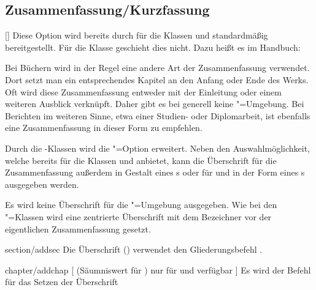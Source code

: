 \subsection{Zusammenfassung/Kurzfassung}
\begin{Declaration}{[\PSet]}%
\printdeclarationlist%
%
%
%
Diese Option wird bereits durch \KOMAScript{} für die Klassen  
und  standardmäßig bereitgestellt. Für die Klasse 
 geschieht dies nicht. Dazu heißt es im Handbuch:
%
\begin{quoting}
Bei Büchern wird in der Regel eine andere Art der Zusammenfassung verwendet. 
Dort setzt man ein entsprechendes Kapitel an den Anfang oder Ende des Werks. 
Oft wird diese Zusammenfassung entweder mit der Einleitung oder einem weiteren 
Ausblick verknüpft. Daher gibt es bei  generell keine 
"=Umgebung. Bei Berichten im weiteren Sinne, etwa einer 
Studien- oder Diplomarbeit, ist ebenfalls eine Zusammenfassung in dieser Form 
zu empfehlen.
\end{quoting}
%
Durch die \TUDScript-Klassen wird die "=Option erweitert. 
Neben den Auswahlmöglichkeit, welche bereits \KOMAScript{} für die Klassen 
 und  anbietet, kann die Überschrift für 
die Zusammenfassung außerdem in Gestalt eines \sectionautorefname{}s oder für 
 und  in der Form eines 
\chapterautorefname{}s ausgegeben werden.
%
\begin{values}
  Es wird keine Überschrift für die "=Umgebung ausgegeben.
  Wie bei den \KOMAScript"=Klassen wird eine zentrierte Überschrift mit dem 
  Bezeichner  vor der eigentlichen Zusammenfassung gesetzt.
\item[section/addsec]
  Die Überschrift () verwendet den Gliederungsbefehl 
  .
\item[chapter/addchap][%
    (Säumniswert für \Class{tudscrbook})
    nur für \Class{tudscrreprt} und \Class{tudscrbook} verfügbar%
  ]
  Es wird der Befehl  für das Setzen der Überschrift 

\end{values}
\end{Declaration}
